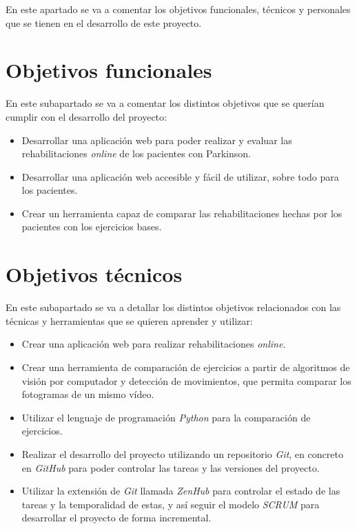 
En este apartado se va a comentar los objetivos funcionales, técnicos y personales que se tienen en el desarrollo de este proyecto.

\section{Objetivos funcionales}
En este subapartado se va a comentar los distintos objetivos que se querían cumplir con el desarrollo del proyecto:
\begin{itemize}
	\item Desarrollar una aplicación web para poder realizar y evaluar las rehabilitaciones \textit{online} de los pacientes con Parkinson.
	\item Desarrollar una aplicación web accesible y fácil de utilizar, sobre todo para los pacientes.
	\item Crear un herramienta capaz de comparar las rehabilitaciones hechas por los pacientes con los ejercicios bases.
\end{itemize}

\section{Objetivos técnicos}
En este subapartado se va a detallar los distintos objetivos relacionados con las técnicas y herramientas que se quieren aprender y utilizar:
\begin{itemize}
	\item Crear una aplicación web para realizar rehabilitaciones \textit{online}.
	\item Crear una herramienta de comparación de ejercicios a partir de algoritmos de visión por computador y detección de movimientos, que permita comparar los fotogramas de un mismo vídeo.
	\item Utilizar el lenguaje de programación \textit{Python} para la comparación de ejercicios.
	\item Realizar el desarrollo del proyecto utilizando un repositorio \textit{Git}, en concreto en \textit{GitHub} para poder controlar las tareas y las versiones del proyecto.
	\item Utilizar la extensión de \textit{Git} llamada \textit{ZenHub} para controlar el estado de las tareas y la temporalidad de estas, y así seguir el modelo \textit{SCRUM} para desarrollar el proyecto de forma incremental.
\end{itemize}


